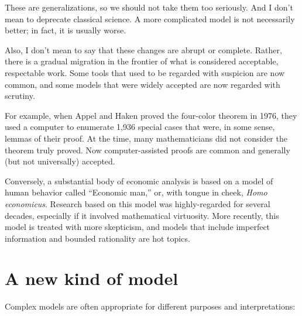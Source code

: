 \documentclass[10pt]{book}
\begin{document}
These are generalizations, so we should not take them
too seriously.  And I don't mean to deprecate
classical science.  A more complicated model is not necessarily better;
in fact, it is usually worse.

Also, I don't mean to say that these changes are abrupt or complete.
Rather, there is a gradual migration in the frontier of what is
considered acceptable, respectable work.  Some tools that used
to be regarded with suspicion are now common, and some 
models that were widely accepted are now regarded with scrutiny.

For example, when Appel and Haken proved the four-color theorem in
1976, they used a computer to enumerate 1,936 special cases that were,
in some sense, lemmas of their proof.  At the time, many
mathematicians did not consider the theorem truly proved.  Now
computer-assisted proofs are common and generally (but not
universally) accepted.

Conversely, a substantial body of economic analysis is based on a
model of human behavior called ``Economic man,'' or, with tongue in
cheek, {\it Homo economicus}.  Research based on this model was
highly-regarded for several decades, especially if it involved
mathematical virtuosity.  More recently, this model is treated with
more skepticism, and models that include imperfect information and
bounded rationality are hot topics.

\section{A new kind of model}

Complex models are often appropriate for different purposes and
interpretations:
\end{document}

